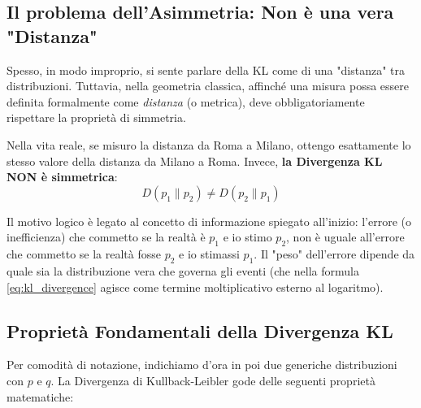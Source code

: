 \subsection{Il problema dell'Asimmetria: Non è una vera "Distanza"}

Spesso, in modo improprio, si sente parlare della KL come di una "distanza" tra distribuzioni. Tuttavia, nella geometria classica, affinché una misura possa essere definita formalmente come \textit{distanza} (o metrica), deve obbligatoriamente rispettare la proprietà di simmetria. 

Nella vita reale, se misuro la distanza da Roma a Milano, ottengo esattamente lo stesso valore della distanza da Milano a Roma. 
Invece, \textbf{la Divergenza KL NON è simmetrica}:
\begin{equation}
D(p_1 \parallel p_2) \neq D(p_2 \parallel p_1)
\end{equation}

Il motivo logico è legato al concetto di informazione spiegato all'inizio: l'errore (o inefficienza) che commetto se la realtà è $p_1$ e io stimo $p_2$, non è uguale all'errore che commetto se la realtà fosse $p_2$ e io stimassi $p_1$. Il "peso" dell'errore dipende da quale sia la distribuzione vera che governa gli eventi (che nella formula \ref{eq:kl_divergence} agisce come termine moltiplicativo esterno al logaritmo).

\subsection{Proprietà Fondamentali della Divergenza KL}

Per comodità di notazione, indichiamo d'ora in poi due generiche distribuzioni con $p$ e $q$. La Divergenza di Kullback-Leibler gode delle seguenti proprietà matematiche:

